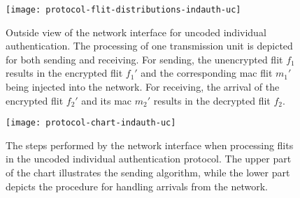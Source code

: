 \begin{figure}
    \centering
    \texttt{[image: protocol-flit-distributions-indauth-uc]}
    \caption[Uncoded ind. auth., outside view]{Outside view of the network interface for uncoded individual authentication. The processing of one
    transmission unit is depicted for both sending and receiving. For sending, the unencrypted flit $f_1$ results in the encrypted flit $f_1'$ and the
    corresponding \gls{mac} flit $m_1'$ being injected into the network. For receiving, the arrival of the encrypted flit $f_2'$ and its \gls{mac}
    $m_2'$ results in the decrypted flit $f_2$.}
    \label{fig:protflitdistindauthuc}
\end{figure}

\begin{figure}
    \centering
    \texttt{[image: protocol-chart-indauth-uc]}
    \caption[Uncoded ind. auth., detailed procedure]{The steps performed by the network interface when processing flits in the uncoded individual
    authentication protocol. The upper part of the chart illustrates the sending algorithm, while the lower part depicts the procedure for handling
    arrivals from the network.}
    \label{fig:protchartindauthuc}
\end{figure}

